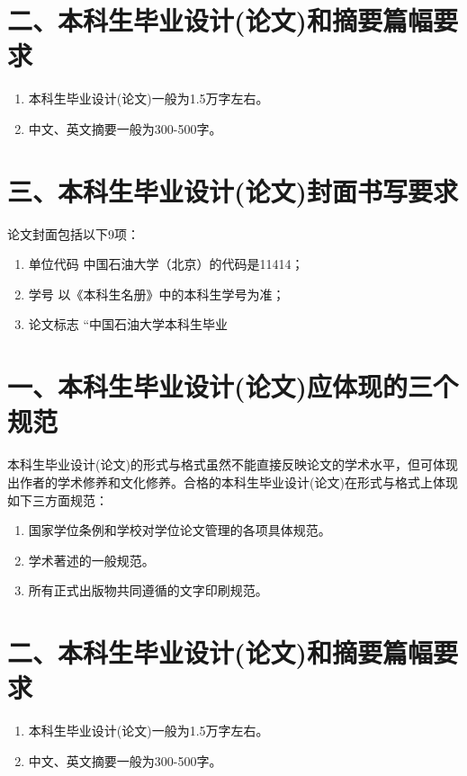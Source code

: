 \documentclass{cupb-thesis}
\begin{document}
\section{二、本科生毕业设计(论文)和摘要篇幅要求}

\begin{enumerate}[label=\arabic*.]
  \item 本科生毕业设计(论文)一般为1.5万字左右。
  \item 中文、英文摘要一般为300-500字。
\end{enumerate}
\section{三、本科生毕业设计(论文)封面书写要求}

论文封面包括以下9项：

\begin{enumerate}[label=（\arabic*）]
  \item 单位代码    中国石油大学（北京）的代码是11414；
  \item 学号        以《本科生名册》中的本科生学号为准；
  \item 论文标志    “中国石油大学本科生毕业
\end{enumerate}
\section{一、本科生毕业设计(论文)应体现的三个规范}

本科生毕业设计(论文)的形式与格式虽然不能直接反映论文的学术水平，但可体现出作者的学术修养和文化修养。合格的本科生毕业设计(论文)在形式与格式上体现如下三方面规范：

\begin{enumerate}[label=\arabic*.]
  \item 国家学位条例和学校对学位论文管理的各项具体规范。
  \item 学术著述的一般规范。
  \item 所有正式出版物共同遵循的文字印刷规范。
\end{enumerate}
\section{二、本科生毕业设计(论文)和摘要篇幅要求}

\begin{enumerate}[label=\arabic*.]
  \item 本科生毕业设计(论文)一般为1.5万字左右。
  \item 中文、英文摘要一般为300-500字。
\end{enumerate}
\end{document}

